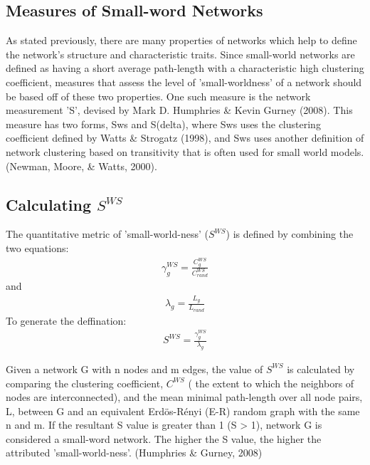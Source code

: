 \documentclass[11pt,letterpaper,doublespacing,titlepage]{article}
\begin{document}
\subsection{Measures of Small-word Networks}
\par
As stated previously, there are many properties of networks which help to define the network's  structure and characteristic traits. Since small-world networks are defined as having a short average path-length with a characteristic high clustering coefficient, measures that assess the level of 'small-worldness' of a network should be based off of these two properties. One such measure is the network measurement 'S', devised by Mark D. Humphries \& Kevin Gurney (2008).  This measure has two forms, Sws  and S(delta), where Sws  uses the clustering coefficient defined by Watts \& Strogatz (1998), and Sws  uses another definition of network clustering based on transitivity that is often used for small world models. (Newman, Moore, \& Watts, 2000). 
\subsection{Calculating  $S^{WS}$}
\par
The quantitative metric of 'small-world-ness' ($S^{WS}$) is defined by combining the two equations:
\begin{eqnarray}
\gamma_g^{WS} = \frac{C_g^{WS}}{C_{rand}^{WS}}
\end{eqnarray}
and
\begin{eqnarray}
\lambda_g = \frac{L_g}{L_{rand}}
\end{eqnarray}
To generate the deffination:
\begin{eqnarray}
S^{WS} = \frac{\gamma_g^{WS}}{\lambda_g}
\end{eqnarray}
\par
Given a network G with n nodes and m edges, the value of $S^{WS}$ is calculated by comparing the clustering coefficient, $C^{WS}$  ( the extent to which the neighbors of nodes are interconnected), and the mean minimal path-length over all node pairs, L, between G and an equivalent Erdös-Rényi (E-R) random graph with the same n and m. If the resultant S value is greater than 1 (S > 1), network G is considered a small-word network. The higher the S value, the higher the attributed 'small-world-ness'. (Humphries \& Gurney, 2008)
\end{document}
